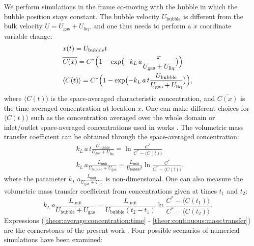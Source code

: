 \documentclass[preprint,12pt]{elsarticle}
\newcommand{\beq}{\begin{equation}}
\newcommand{\feq}{\end{equation}}
\newcommand{\beqal}{\begin{equation}\begin{aligned}}
\newcommand{\feqal}{\end{aligned}\end{equation}}
\newcommand{\vol}{k_L\,a}
\newcommand{\lunit}{L_{\mathrm{unit}}}
\newcommand{\ububble}{U_{\mathrm{bubble}}}
\newcommand{\uliq}{U_{\mathrm{liq}}}
\newcommand{\ugas}{U_{\mathrm{gas}}}
\newcommand{\cstar}{C^{*}}
\newcommand{\volnondim}{\vol \frac{\lunit}{\ububble+\ugas}}
\begin{document}
We perform simulations in the frame co-moving with the bubble
in which the bubble position stays constant. The bubble velocity $\ububble$ is
different from the bulk velocity $U=\ugas+\uliq$, and one thus needs to perform a $x$ coordinate
variable change:
\beqal
\label{theor:average:concentration:time}
&x(t)=\ububble t\\
&\overline{C(x)}=\cstar \Bigl(1-\exp\bigl(-\vol \frac{x}{\ugas+\uliq}\bigr)\Bigr)\\
&\langle C(t)\rangle=\cstar \Bigl(1-\exp\bigl(-\vol\, t \frac{\ububble}{\ugas+\uliq}\bigr)\Bigr),
\feqal
where $\langle C(t)\rangle$ is the space-averaged characteristic concentration,
and $\overline{C(x)}$ is the time-averaged concentration at location $x$. 
One can make different choices for
$\langle C(t) \rangle$ such as the concentration averaged over the whole domain or inlet/outlet space-averaged
concentrations used in works \cite{vanbaten-circular,kreutzer-overview}.  
The volumetric mass transfer coefficient can be obtained through the space-averaged concentration:
\beqal
\label{theor:one:concentration:time}
&\vol\, t \frac{\ububble}{\ugas+\uliq}=\ln \frac{\cstar}{\cstar-\langle C(t)\rangle}\\
&\volnondim=\frac{\lunit}{\ububble t}\ln \frac{\cstar}{\cstar-\langle C(t) \rangle},
\feqal
where the parameter $\vol \frac{\lunit}{\ugas+\uliq}$ is non-dimensional. One can also measure the
volumetric mass transfer coefficient from concentrations given at times $t_1$ and $t_2$:
\beq
\label{theor:continuous:mass:transfer}
\volnondim=\frac{\lunit}{\ububble
(t_2-t_1)}\ln\frac{C^{*}-\langle C(t_1) \rangle}{C^{*}-\langle C(t_2) \rangle}.
\feq
Expressions (\ref{theor:average:concentration:time} - \ref{theor:continuous:mass:transfer}) are the
cornerstones of the present work . Four possible scenarios of numerical simulations have been examined: 
\end{document}
